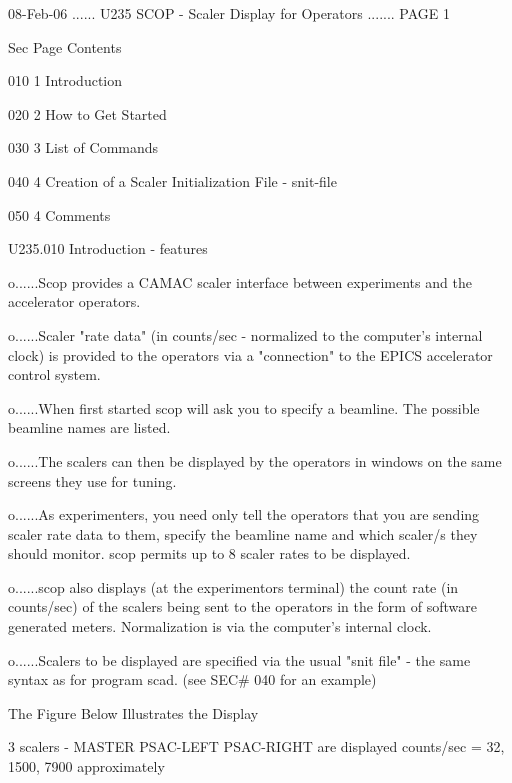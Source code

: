    08-Feb-06 ...... U235  SCOP - Scaler Display for Operators ....... PAGE   1
 
   Sec  Page Contents
 
   010    1  Introduction
 
   020    2  How to Get Started
 
   030    3  List of Commands
 
   040    4  Creation of a Scaler Initialization File - snit-file
 
   050    4  Comments
 
 
   U235.010  Introduction - features
 
   o......Scop  provides  a CAMAC scaler interface between experiments and the
          accelerator operators.
 
   o......Scaler "rate data" (in counts/sec -  normalized  to  the  computer's
          internal  clock)  is provided to the operators via a "connection" to
          the EPICS accelerator control system.
 
   o......When first started scop  will ask you to  specify  a  beamline.  The
          possible beamline names are listed.
 
   o......The  scalers  can  then  be displayed by the operators in windows on
          the same screens they use for tuning.
 
   o......As experimenters, you need only tell  the  operators  that  you  are
          sending  scaler  rate  data  to  them, specify the beamline name and
          which scaler/s they should monitor. scop  permits  up  to  8  scaler
          rates to be displayed.
 
   o......scop  also  displays  (at the experimentors terminal) the count rate
          (in counts/sec) of the scalers being sent to the  operators  in  the
          form  of  software  generated  meters.  Normalization  is  via   the
          computer's internal clock.
 
   o......Scalers  to  be  displayed are specified via the usual "snit file" -
          the same syntax as for program scad. (see SEC# 040 for an example)
 
                    The Figure Below Illustrates the Display
 
   3 scalers  -     MASTER         PSAC-LEFT      PSAC-RIGHT     are displayed
   counts/sec =         32,             1500,           7900     approximately
 
 
 
 
 
